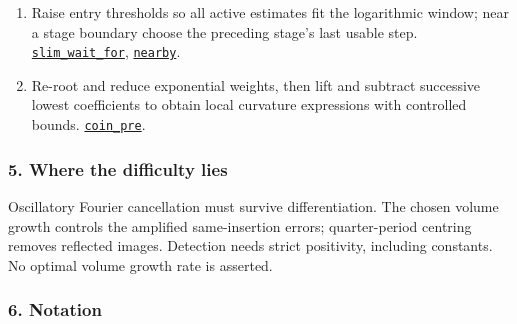 \documentclass[
  letterpaper,
  11pt]{article}
\begin{document}
\begin{enumerate}
  Rank estimates give moving-detector convergence; free detection and
  recursive retractions yield compatible charts.
  \href{https://github.com/yang-mills-group/OpenAI-YM-20261028/blob/3456e5e75cf8d4cd558955a5c7638fba2d68f464/YM/SharpGram/Weak/Reading.lean\#L107-L124}{\texttt{Portfolio.twoC}},
  \href{https://github.com/yang-mills-group/OpenAI-YM-20261028/blob/3456e5e75cf8d4cd558955a5c7638fba2d68f464/YM/SharpGram/Weak/Compatible.lean\#L140-L159}{\texttt{tune\_grades}}.
\item
  Raise entry thresholds so all active estimates fit the logarithmic
  window; near a stage boundary choose the preceding stage's last usable
  step.
  \href{https://github.com/yang-mills-group/OpenAI-YM-20261028/blob/3456e5e75cf8d4cd558955a5c7638fba2d68f464/YM/SharpGram/Dense/Slender.lean\#L127-L143}{\texttt{slim\_wait\_for}},
  \href{https://github.com/yang-mills-group/OpenAI-YM-20261028/blob/3456e5e75cf8d4cd558955a5c7638fba2d68f464/YM/SharpGram/Dense/Cover.lean\#L155-L165}{\texttt{nearby}}.
\item
  Re-root and reduce exponential weights, then lift and subtract
  successive lowest coefficients to obtain local curvature expressions
  with controlled bounds.
  \href{https://github.com/yang-mills-group/OpenAI-YM-20261028/blob/3456e5e75cf8d4cd558955a5c7638fba2d68f464/YM/RG08/Dart/Seams.lean\#L34-L45}{\texttt{coin\_pre}}.
\end{enumerate}

\subsubsection{5. Where the difficulty
lies}\label{where-the-difficulty-lies-25}

Oscillatory Fourier cancellation must survive differentiation. The
chosen volume growth controls the amplified same-insertion errors;
quarter-period centring removes reflected images. Detection needs strict
positivity, including constants. No optimal volume growth rate is
asserted.

\subsubsection{6. Notation}\label{notation-25}
\end{document}
